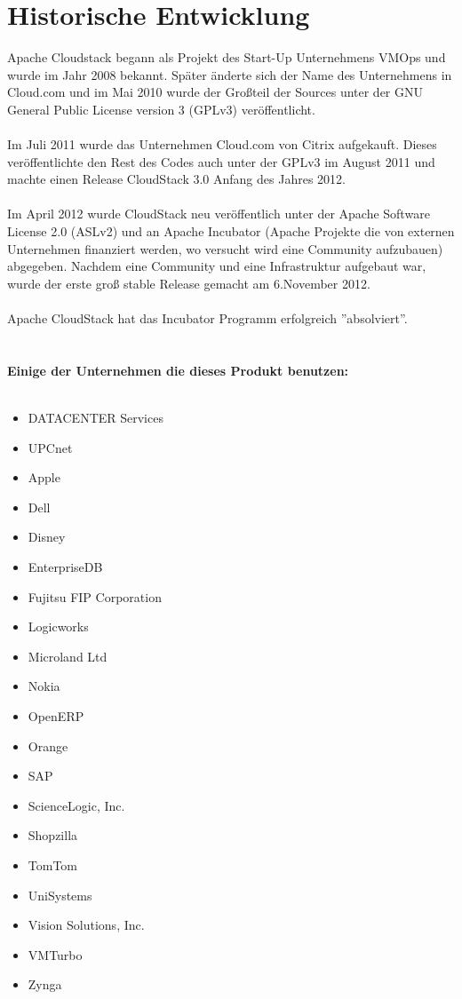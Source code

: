 \documentclass[a4paper,nochapterprefix,ngerman,12pt]{scrreprt}
\begin{document}
\section{Historische Entwicklung \cite{apachehistory,apacheusers}}
Apache Cloudstack begann als Projekt des Start-Up Unternehmens VMOps und wurde im Jahr 2008 bekannt. Später änderte sich der Name des Unternehmens in Cloud.com und im Mai 2010 wurde der Großteil der Sources unter der GNU General Public License version 3 (GPLv3) veröffentlicht.\\\\
Im Juli 2011 wurde das Unternehmen Cloud.com von Citrix aufgekauft. Dieses veröffentlichte den Rest des Codes auch unter der GPLv3 im August 2011 und machte einen Release CloudStack 3.0 Anfang des Jahres 2012.\\\\
Im April 2012 wurde CloudStack neu veröffentlich unter der Apache Software License 2.0 (ASLv2) und an Apache Incubator (Apache Projekte die von externen Unternehmen finanziert werden, wo versucht wird eine Community aufzubauen) abgegeben. Nachdem eine Community und eine Infrastruktur aufgebaut war, wurde der erste groß stable Release gemacht am 6.November 2012.\\\\
Apache CloudStack hat das Incubator Programm erfolgreich ''absolviert''.\\\\\\
\textbf{Einige der Unternehmen die dieses Produkt benutzen:\\\\}
\begin{minipage}{.5\textwidth}
	\begin{itemize}
		\item DATACENTER Services
		\item UPCnet
		\item Apple
		\item Dell
		\item Disney
		\item EnterpriseDB
		\item Fujitsu FIP Corporation
		\item Logicworks
		\item Microland Ltd
		\item Nokia
	\end{itemize}
\end{minipage}
\begin{minipage}{.5\textwidth}
	\begin{itemize}
		\item OpenERP
		\item Orange
		\item SAP
		\item ScienceLogic, Inc.
		\item Shopzilla
		\item TomTom
		\item UniSystems
		\item Vision Solutions, Inc.
		\item VMTurbo
		\item Zynga
	\end{itemize}
\end{minipage}
\end{document}
